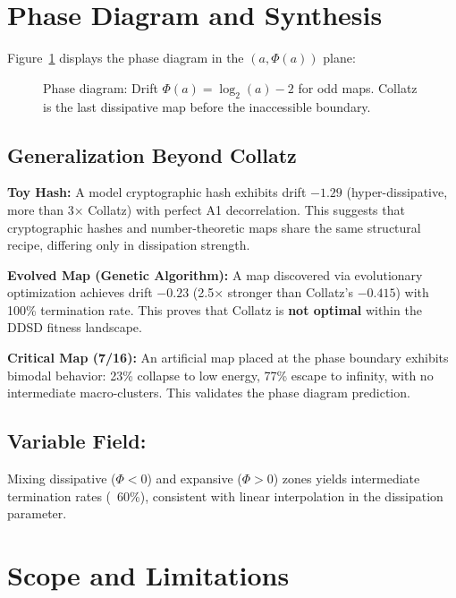 \documentclass[11pt,a4paper]{article}
\theoremstyle{plain}
\theoremstyle{definition}
\theoremstyle{remark}
\begin{document}
\section{Phase Diagram and Synthesis}
\label{sec:results}

Figure~\ref{fig:phase} displays the phase diagram in the $(a, \Phi(a))$ plane:

\begin{figure}[H]
\centering
{}
\caption{Phase diagram: Drift $\Phi(a) = \log_2(a) - 2$ for odd maps. Collatz is the last dissipative map before the inaccessible boundary.}
\label{fig:phase}
\end{figure}

\subsection{Generalization Beyond Collatz}

\textbf{Toy Hash:} A model cryptographic hash exhibits drift $-1.29$ (hyper-dissipative, more than 3× Collatz) with perfect A1 decorrelation. This suggests that cryptographic hashes and number-theoretic maps share the same structural recipe, differing only in dissipation strength.

\textbf{Evolved Map (Genetic Algorithm):} A map discovered via evolutionary optimization achieves drift $-0.23$ (2.5× stronger than Collatz's $-0.415$) with 100\% termination rate. This proves that Collatz is \textbf{not optimal} within the DDSD fitness landscape.

\textbf{Critical Map (7/16):} An artificial map placed at the phase boundary exhibits bimodal behavior: 23\% collapse to low energy, 77\% escape to infinity, with no intermediate macro-clusters. This validates the phase diagram prediction.

\subsection{Variable Field:} Mixing dissipative ($\Phi < 0$) and expansive ($\Phi > 0$) zones yields intermediate termination rates (~60\%), consistent with linear interpolation in the dissipation parameter.

\section{Scope and Limitations}
\label{sec:limitations}
\end{document}
